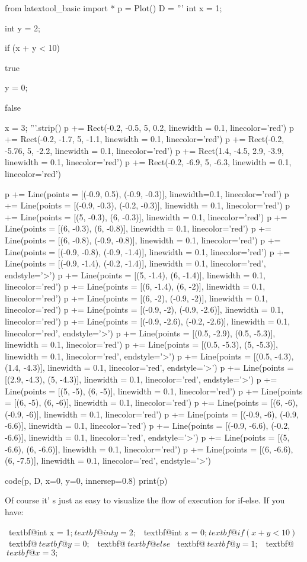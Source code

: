 \begin{python}
from latextool_basic import *
p = Plot()
D = '''
int x = 1;


int y = 2;


if (x + y < 10)

   true

        y = 0;

   false



x = 3;
'''.strip()
p += Rect(-0.2, -0.5, 5, 0.2, linewidth = 0.1, linecolor='red')
p += Rect(-0.2, -1.7, 5, -1.1, linewidth = 0.1, linecolor='red')
p += Rect(-0.2, -5.76, 5, -2.2, linewidth = 0.1, linecolor='red')
p += Rect(1.4, -4.5, 2.9, -3.9, linewidth = 0.1, linecolor='red')
p += Rect(-0.2, -6.9, 5, -6.3, linewidth = 0.1, linecolor='red')

p += Line(points = [(-0.9, 0.5), (-0.9, -0.3)], linewidth=0.1, linecolor='red')
p += Line(points = [(-0.9, -0.3), (-0.2, -0.3)], linewidth = 0.1, linecolor='red')
p += Line(points = [(5, -0.3), (6, -0.3)], linewidth = 0.1, linecolor='red') 
p += Line(points = [(6, -0.3), (6, -0.8)], linewidth = 0.1, linecolor='red')
p += Line(points = [(6, -0.8), (-0.9, -0.8)], linewidth = 0.1, linecolor='red')
p += Line(points = [(-0.9, -0.8), (-0.9, -1.4)], linewidth = 0.1, linecolor='red')
p += Line(points = [(-0.9, -1.4), (-0.2, -1.4)], linewidth = 0.1, linecolor='red', endstyle='>')
p += Line(points = [(5, -1.4), (6, -1.4)], linewidth = 0.1, linecolor='red')
p += Line(points = [(6, -1.4), (6, -2)], linewidth = 0.1, linecolor='red')
p += Line(points = [(6, -2), (-0.9, -2)], linewidth = 0.1, linecolor='red')
p += Line(points = [(-0.9, -2), (-0.9, -2.6)], linewidth = 0.1, linecolor='red')
p += Line(points = [(-0.9, -2.6), (-0.2, -2.6)], linewidth = 0.1, linecolor='red', endstyle='>')
p += Line(points = [(0.5, -2.9), (0.5, -5.3)], linewidth = 0.1, linecolor='red')
p += Line(points = [(0.5, -5.3), (5, -5.3)], linewidth = 0.1, linecolor='red', endstyle='>')
p += Line(points = [(0.5, -4.3), (1.4, -4.3)], linewidth = 0.1, linecolor='red', endstyle='>')
p += Line(points = [(2.9, -4.3), (5, -4.3)], linewidth = 0.1, linecolor='red', endstyle='>')
p += Line(points = [(5, -5), (6, -5)], linewidth = 0.1, linecolor='red')
p += Line(points = [(6, -5), (6, -6)], linewidth = 0.1, linecolor='red')
p += Line(points = [(6, -6), (-0.9, -6)], linewidth = 0.1, linecolor='red')
p += Line(points = [(-0.9, -6), (-0.9, -6.6)], linewidth = 0.1, linecolor='red')
p += Line(points = [(-0.9, -6.6), (-0.2, -6.6)], linewidth = 0.1, linecolor='red', endstyle='>')
p += Line(points = [(5, -6.6), (6, -6.6)], linewidth = 0.1, linecolor='red')
p += Line(points = [(6, -6.6), (6, -7.5)], linewidth = 0.1, linecolor='red', endstyle='>')

code(p, D, x=0, y=0, innersep=0.8)
print(p)
\end{python}
Of course it' s just as easy to visualize the flow of
execution for if-else. If you have:
\begin{console}[commandchars=\~\@\$]
~textbf@int x = 1;$
~textbf@int y = 2;$
~textbf@int z = 0;$
~textbf@if (x + y < 10)$
~textbf@{$
    ~textbf@y = 0;$
~textbf@}$
~textbf@else$
~textbf@{$
    ~textbf@y = 1;$
~textbf@}$
~textbf@x = 3;$
\end{console}

